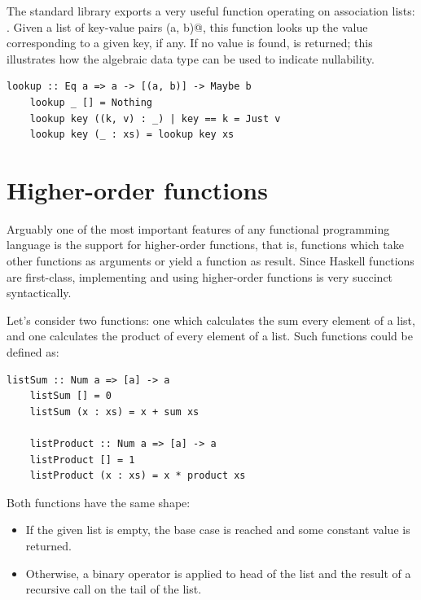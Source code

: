 \documentclass[UdineBachThesis,american,11pt]{PhdThesis}
\begin{document}
  The standard library exports a very useful function operating on association
  lists: \lstinline@lookup@. Given a list of key-value pairs \lstinline@(a, b)@,
  this function looks up the value corresponding to a given key, if any. If no
  value is found, \lstinline@Nothing@ is returned; this illustrates how the
  algebraic data type \lstinline@Maybe@ can be used to indicate nullability.

  \begin{lstlisting}[gobble=4,basicstyle=\ttfamily\small]
    lookup :: Eq a => a -> [(a, b)] -> Maybe b
    lookup _ [] = Nothing
    lookup key ((k, v) : _) | key == k = Just v
    lookup key (_ : xs) = lookup key xs
  \end{lstlisting}

  \section{Higher-order functions}

  Arguably one of the most important features of any functional programming
  language is the support for higher-order functions, that is, functions which
  take other functions as arguments or yield a function as result. Since Haskell
  functions are first-class, implementing and using higher-order functions is
  very succinct syntactically.

  Let's consider two functions: one which calculates the sum every element of a
  list, and one calculates the product of every element of a list. Such
  functions could be defined as:

  \begin{lstlisting}[gobble=4,basicstyle=\ttfamily\small]
    listSum :: Num a => [a] -> a
    listSum [] = 0
    listSum (x : xs) = x + sum xs

    listProduct :: Num a => [a] -> a
    listProduct [] = 1
    listProduct (x : xs) = x * product xs
  \end{lstlisting}

  Both functions have the same shape:

  \begin{itemize}
    \item If the given list is empty, the base case is reached and some constant
    value is returned.

    \item Otherwise, a binary operator is applied to head of the list and the
    result of a recursive call on the tail of the list.
  \end{itemize}
\end{document}
